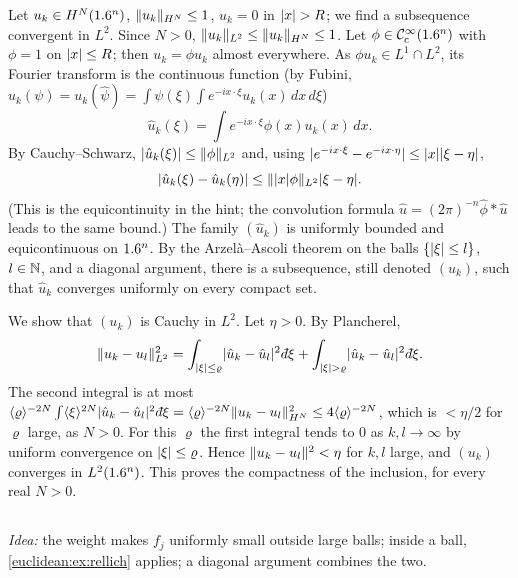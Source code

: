 Let $u_k\in H^N(1.6^n)$, $\lVert u_k\rVert_{H^N}\le1$, $u_k=0$ in $\lvert x\rvert>R$; we find a
subsequence convergent in $L^2$. Since $N>0$, $\lVert u_k\rVert_{L^2}\le\lVert u_k\rVert_{H^N}\le1$.
Let $\phi\in\mathcal{C}^\infty_{\mathrm{c}}(1.6^n)$ with $\phi=1$ on $\lvert x\rvert\le R$; then $u_k=\phi u_k$ almost
everywhere. As $\phi u_k\in L^1\cap L^2$, its Fourier transform is the continuous
function (by Fubini, $\hat u_k(\psi)=u_k(\hat\psi)=\int\psi(\xi)\int e^{-ix\cdot\xi}u_k(x)\,dx\,d\xi$)
\begin{equation*}
  \hat u_k(\xi)=\int e^{-ix\cdot\xi}\phi(x)u_k(x)\,dx .
\end{equation*}
By Cauchy--Schwarz, $\lvert \hat u_k(\xi)\rvert\le\lVert \phi\rVert_{L^2}$ and, using
$\lvert e^{-ix\cdot\xi}-e^{-ix\cdot\eta}\rvert\le\lvert x\rvert\lvert \xi-\eta\rvert$,
\begin{equation*}
  \lvert \hat u_k(\xi)-\hat u_k(\eta)\rvert\le\lVert \lvert x\rvert\phi\rVert_{L^2}\lvert \xi-\eta\rvert.
\end{equation*}
(This is the equicontinuity in the hint; the convolution formula
$\hat u=(2\pi)^{-n}\hat\phi*\hat u$ leads to the same bound.) The family $(\hat u_k)$ is
uniformly bounded and equicontinuous on $1.6^n$. By the Arzel\`a--Ascoli theorem on the
balls $\{\lvert \xi\rvert\le l\}$, $l\in\mathbb{N}$, and a diagonal argument, there is a subsequence, still
denoted $(u_k)$, such that $\hat u_k$ converges uniformly on every compact set.

We show that $(u_k)$ is Cauchy in $L^2$. Let $\eta>0$. By Plancherel,
\begin{equation*}
  \norm{u_k-u_l}_{L^2}^2=\int_{\abs\xi\le\varrho}\abs{\hat u_k-\hat u_l}^2\,\dbar\xi
  +\int_{\abs\xi>\varrho}\abs{\hat u_k-\hat u_l}^2\,\dbar\xi .
\end{equation*}
The second integral is at most
$\ang\varrho^{-2N}\int\ang\xi^{2N}\abs{\hat u_k-\hat u_l}^2\,\dbar\xi
=\ang\varrho^{-2N}\norm{u_k-u_l}_{H^N}^2\le4\ang\varrho^{-2N}$, which is $<\eta/2$ for
$\varrho$ large, as $N>0$. For this $\varrho$ the first integral tends to $0$ as
$k,l\to\infty$ by uniform convergence on $\lvert \xi\rvert\le\varrho$. Hence
$\lVert u_k-u_l\rVert^2<\eta$ for $k,l$ large, and $(u_k)$ converges in $L^2(1.6^n)$. This proves
the compactness of the inclusion, for every real $N>0$.

\subsection*{}

\emph{Idea:} the weight makes $f_j$ uniformly small outside large balls; inside a ball,
\cref{euclidean:ex:rellich} applies; a diagonal argument combines the two.

